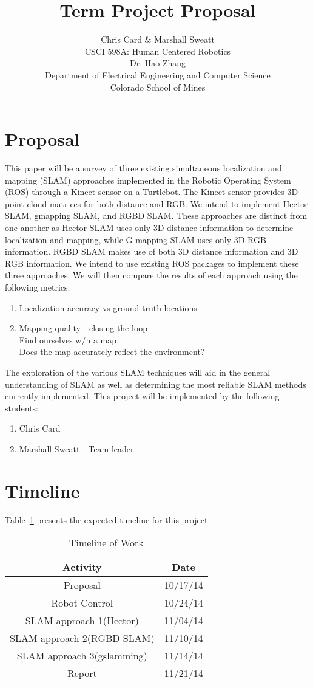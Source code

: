 \documentclass[10pt]{article}
\title{Term Project Proposal}
\author{Chris Card \& Marshall Sweatt\\
CSCI 598A: Human Centered Robotics\\
Dr. Hao Zhang\\
Department of Electrical Engineering and Computer Science\\
Colorado School of Mines}
\begin{document}
\maketitle
\newpage
\section{Proposal}
This paper will be a survey of three existing simultaneous localization and mapping (SLAM) approaches implemented in the Robotic Operating System (ROS) through a Kinect sensor on a Turtlebot.    The Kinect sensor provides 3D point cloud matrices for both distance and RGB.  We intend to implement Hector SLAM, gmapping SLAM, and RGBD SLAM.  These approaches are distinct from one another as Hector SLAM uses only 3D distance information to determine localization and mapping, while G-mapping SLAM uses only 3D RGB information.  RGBD SLAM makes use of both 3D distance information and 3D RGB information.  
We intend to use existing ROS packages to implement these three approaches.  We will then compare the results of each approach using the following metrics:
\begin{enumerate}
\item Localization accuracy vs ground truth locations
\item Mapping quality - closing the loop\\
Find ourselves w/n a map\\
Does the map accurately reflect the environment?
\end{enumerate}
The exploration of the various SLAM techniques will aid in the general understanding of SLAM as well as determining the most reliable SLAM methods currently implemented.  
This project will be implemented by the following students:
\begin{enumerate}
\item Chris Card
\item Marshall Sweatt - Team leader
\end{enumerate}

\section{Timeline}
Table~\ref{tab:timeline} presents the expected timeline for this project.
\begin{table}[h!]
\centering
\caption{Timeline of Work}
\begin{tabular}{|c|c|}
\hline
Activity & Date\\
\hline
Proposal & 10/17/14\\
Robot Control & 10/24/14\\
SLAM approach 1(Hector) & 11/04/14\\
SLAM approach 2(RGBD SLAM) & 11/10/14\\
SLAM approach 3(gslamming) & 11/14/14\\
Report & 11/21/14\\
\hline
\end{tabular}
\label{tab:timeline}
\end{table}
\end{document}
